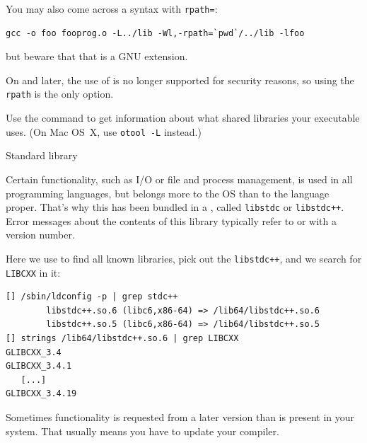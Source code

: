 \begin{remark}
  You may also come across a syntax with \lstinline{rpath=}:
\begin{lstlisting}[language=shell]
  gcc -o foo fooprog.o -L../lib -Wl,-rpath=`pwd`/../lib -lfoo
\end{lstlisting}
but beware that that is a GNU extension.
\end{remark}

\begin{remark}
  On  and later,
  the use of 
  is no longer supported for security reasons, so using the \lstinline{rpath} is the only option.
\end{remark}
Use the command  to get information about what shared libraries
your executable uses. (On Mac OS~X, use \lstinline{otool -L} instead.)

 {Standard library}
\label{sec:stdlib}

Certain functionality, such as I/O or file and process management,
is used in all programming languages, but belongs more
to the \ac{OS} than to the language proper.
That's why this has been bundled in a ,
called \lstinline{libstdc} or \lstinline{libstdc++}.
Error messages about the contents of this library typically
refer to  or 
with a version number.

Here we use  to find all
known libraries, pick out the \lstinline{libstdc++},
and we search for \lstinline{LIBCXX} in it:
\begin{lstlisting}
[] /sbin/ldconfig -p | grep stdc++
        libstdc++.so.6 (libc6,x86-64) => /lib64/libstdc++.so.6
        libstdc++.so.5 (libc6,x86-64) => /lib64/libstdc++.so.5
[] strings /lib64/libstdc++.so.6 | grep LIBCXX
GLIBCXX_3.4
GLIBCXX_3.4.1
   [...]
GLIBCXX_3.4.19
\end{lstlisting}
Sometimes functionality is requested
from a later version than is present in your system.
That usually means you have to update your compiler.




